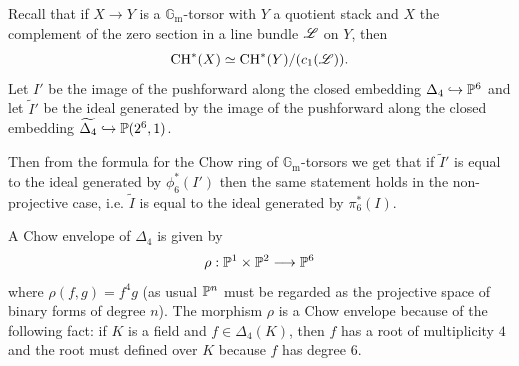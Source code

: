 \documentclass[a4paper, 10pt]{amsart}
\numberwithin{equation}{section}
\numberwithin{subsection}{section}
\theoremstyle{definition}
\theoremstyle{remark}
\newcommand\GG{\mathbb{G}} \newcommand\HH{\mathbb{H}}
\newcommand\rmm{\mathrm{m}} \newcommand\rmn{\mathrm{n}}
\newcommand{\gm}{\GG_{\rmm}}
\newcommand{\ch}[1][*]{\operatorname{CH}^{#1}}
\begin{document}
	Recall that if $X \rightarrow Y$ is a $\gm$-torsor with $Y$ a quotient stack and $X$ the complement of the zero section in a line bundle $\mathscr{L}$ on $Y$, then
	$$ \ch(X) \simeq \ch(Y)/(c_1(\cL)).$$ 
	Let $I'$ be the image of the pushforward along the closed embedding $\Delta_4\hookrightarrow \mathbb{P}^6$ and let $\widetilde{I}'$ be the ideal generated by the image of the pushforward along the closed embedding $\widetilde{\Delta_4}\hookrightarrow \mathbb{P}(2^6,1)$.
	
	Then from the formula for the Chow ring of $\gm$-torsors we get that if $\widetilde{I}'$ is equal to the ideal generated by $\phi_6^*(I')$ then the same statement holds in the non-projective case, i.e. $\widetilde{I}$ is equal to the ideal generated by $\pi_6^*(I)$. 
	
	A Chow envelope of $\Delta_4$ is given by
	$$\rho: \mathbb{P}^1 \times \mathbb{P}^2 \longrightarrow \mathbb{P}^6$$
	where $\rho(f,g)=f^4g$ (as usual $\mathbb{P}^n$ must be regarded as the projective space of binary forms of degree $n$). The morphism $\rho$ is a Chow envelope because of the following fact: if $K$ is a field and $f \in \Delta_4(K)$, then $f$ has a root of multiplicity $4$ and the root must defined over $K$ because $f$ has degree $6$.
	
\end{document}
